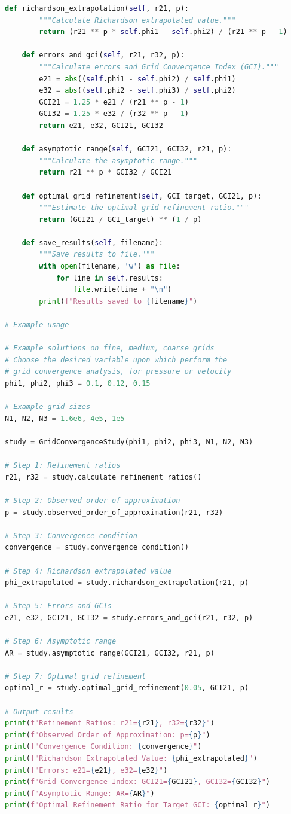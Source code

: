 \documentclass[12pt]{article}
\begin{document}
\begin{lstlisting}[language=Python, caption=Python script used to perform grid convergence analysis., label=lst:gca]
    def richardson_extrapolation(self, r21, p):
        """Calculate Richardson extrapolated value."""
        return (r21 ** p * self.phi1 - self.phi2) / (r21 ** p - 1)

    def errors_and_gci(self, r21, r32, p):
        """Calculate errors and Grid Convergence Index (GCI)."""
        e21 = abs((self.phi1 - self.phi2) / self.phi1)
        e32 = abs((self.phi2 - self.phi3) / self.phi2)
        GCI21 = 1.25 * e21 / (r21 ** p - 1)
        GCI32 = 1.25 * e32 / (r32 ** p - 1)
        return e21, e32, GCI21, GCI32

    def asymptotic_range(self, GCI21, GCI32, r21, p):
        """Calculate the asymptotic range."""
        return r21 ** p * GCI32 / GCI21

    def optimal_grid_refinement(self, GCI_target, GCI21, p):
        """Estimate the optimal grid refinement ratio."""
        return (GCI21 / GCI_target) ** (1 / p)

    def save_results(self, filename):
        """Save results to file."""
        with open(filename, 'w') as file:
            for line in self.results:
                file.write(line + "\n")
        print(f"Results saved to {filename}")

# Example usage

# Example solutions on fine, medium, coarse grids
# Choose the desired variable upon which perform the 
# grid convergence analysis, for pressure or velocity
phi1, phi2, phi3 = 0.1, 0.12, 0.15 

# Example grid sizes
N1, N2, N3 = 1.6e6, 4e5, 1e5

study = GridConvergenceStudy(phi1, phi2, phi3, N1, N2, N3)

# Step 1: Refinement ratios
r21, r32 = study.calculate_refinement_ratios()

# Step 2: Observed order of approximation
p = study.observed_order_of_approximation(r21, r32)

# Step 3: Convergence condition
convergence = study.convergence_condition()

# Step 4: Richardson extrapolated value
phi_extrapolated = study.richardson_extrapolation(r21, p)

# Step 5: Errors and GCIs
e21, e32, GCI21, GCI32 = study.errors_and_gci(r21, r32, p)

# Step 6: Asymptotic range
AR = study.asymptotic_range(GCI21, GCI32, r21, p)

# Step 7: Optimal grid refinement
optimal_r = study.optimal_grid_refinement(0.05, GCI21, p)

# Output results
print(f"Refinement Ratios: r21={r21}, r32={r32}")
print(f"Observed Order of Approximation: p={p}")
print(f"Convergence Condition: {convergence}")
print(f"Richardson Extrapolated Value: {phi_extrapolated}")
print(f"Errors: e21={e21}, e32={e32}")
print(f"Grid Convergence Index: GCI21={GCI21}, GCI32={GCI32}")
print(f"Asymptotic Range: AR={AR}")
print(f"Optimal Refinement Ratio for Target GCI: {optimal_r}")
\end{lstlisting}
\end{document}
